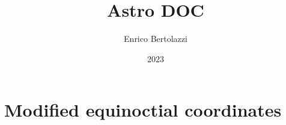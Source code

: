 \documentclass[12pt]{article}
\title{Astro DOC}
\author{Enrico Bertolazzi}
\date{2023}
\begin{document}
\maketitle


\section{Modified equinoctial coordinates}
\end{document}
